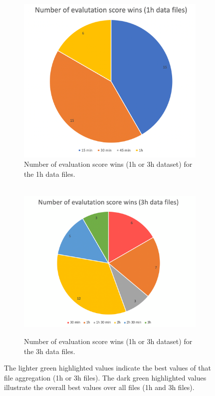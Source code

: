 \begin{figure}
  \centering
  \begin{subfigure}{.475\textwidth}
    \centering
    \includegraphics[width=1\textwidth]{./images/clusteringResults/clusteringResultsGraph1h.png}
    \caption{Number of evaluation score wins (1h or 3h dataset) for the 1h data files.}
    \label{figure:clusteringResultsGraph1h}
  \end{subfigure}
  \hfill
  \begin{subfigure}{.475\textwidth}
    \centering
    \  \includegraphics[width=1.2\textwidth]{./images/clusteringResults/clusteringResultsGraph3h.png}
    \caption{Number of evaluation score wins (1h or 3h dataset) for the 3h data files.}
    \label{figure:clusteringResultsGraph3h}
  \end{subfigure}
	\caption{ The lighter green highlighted values indicate the best values of that file aggregation (1h or 3h files). The dark green highlighted values illustrate the overall best values over all files (1h and 3h files).}
\end{figure}

